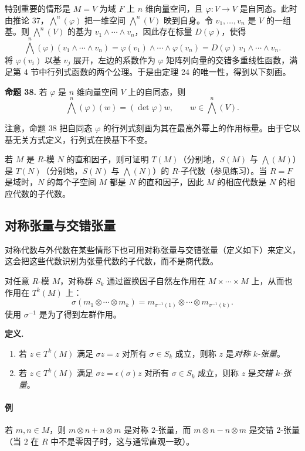 特别重要的情形是 $M=V$ 为域 $F$ 上 $n$ 维向量空间，且 $\varphi:V\to V$ 是自同态。此时由推论 37，$\bigwedge^n(\varphi)$ 把一维空间 $\bigwedge^n(V)$ 映到自身。令 $v_1,
\ldots,v_n$ 是 $V$ 的一组基。则 $\bigwedge^n(V)$ 的基为 $v_1\wedge\cdots\wedge v_n$，因此存在标量 $D(\varphi)$，使得
\[
\bigwedge^n(\varphi)(v_1\wedge\cdots\wedge v_n)
=
\varphi(v_1)\wedge\cdots\wedge\varphi(v_n)
=
D(\varphi)\,v_1\wedge\cdots\wedge v_n.
\]
将 $\varphi(v_i)$ 以基 $v_j$ 展开，左边的系数作为 $\varphi$ 矩阵列向量的交错多重线性函数，满足第 4 节中行列式函数的两个公理。于是由定理 24 的唯一性，得到以下刻画。

\noindent\textbf{命题 38.} 若 $\varphi$ 是 $n$ 维向量空间 $V$ 上的自同态，则
\[
\bigwedge^n(\varphi)(w)=(\det\varphi)w,
\qquad w\in\bigwedge^n(V).
\]

注意，命题 38 把自同态 $\varphi$ 的行列式刻画为其在最高外幂上的作用标量。由于它以基无关方式定义，行列式在换基下不变。

若 $M$ 是 $R$-模 $N$ 的直和因子，则可证明 $T(M)$（分别地，$S(M)$ 与 $\bigwedge(M)$）是 $T(N)$（分别地，$S(N)$ 与 $\bigwedge(N)$）的 $R$-子代数（参见练习）。当 $R=F$ 是域时，$N$ 的每个子空间 $M$ 都是 $N$ 的直和因子，因此 $M$ 的相应代数是 $N$ 的相应代数的子代数。

\subsection*{对称张量与交错张量}

对称代数与外代数在某些情形下也可用对称张量与交错张量（定义如下）来定义，这会把这些代数识别为张量代数的子代数，而不是商代数。

对任意 $R$-模 $M$，对称群 $S_k$ 通过置换因子自然左作用在 $M\times\cdots\times M$ 上，从而也作用在 $T^k(M)$ 上：
\[
\sigma(m_1\otimes\cdots\otimes m_k)
=m_{\sigma^{-1}(1)}\otimes\cdots\otimes m_{\sigma^{-1}(k)}.
\]
使用 $\sigma^{-1}$ 是为了得到左群作用。

\noindent\textbf{定义.}
\begin{enumerate}[label=(\arabic*)]
\item 若 $z\in T^k(M)$ 满足 $\sigma z=z$ 对所有 $\sigma\in S_k$ 成立，则称 $z$ 是\emph{对称 $k$-张量}。
\item 若 $z\in T^k(M)$ 满足 $\sigma z=\epsilon(\sigma)z$ 对所有 $\sigma\in S_k$ 成立，则称 $z$ 是\emph{交错 $k$-张量}。
\end{enumerate}

\paragraph{例}
若 $m,n\in M$，则 $m\otimes n+n\otimes m$ 是对称 $2$-张量，而 $m\otimes n-n\otimes m$ 是交错 $2$-张量（当 $2$ 在 $R$ 中不是零因子时，这与通常直观一致）。

